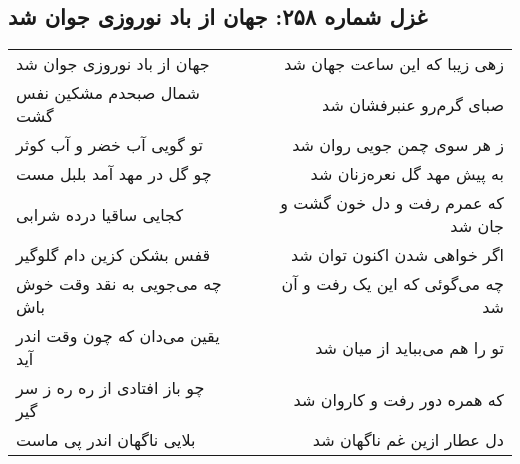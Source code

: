\begin{center}
\section*{غزل شماره ۲۵۸: جهان از باد نوروزی جوان شد}
\label{sec:258}
\begin{longtable}{l p{0.5cm} r}
جهان از باد نوروزی جوان شد
&&
زهی زیبا که این ساعت جهان شد
\\
شمال صبحدم مشکین نفس گشت
&&
صبای گرم‌رو عنبرفشان شد
\\
تو گویی آب خضر و آب کوثر
&&
ز هر سوی چمن جویی روان شد
\\
چو گل در مهد آمد بلبل مست
&&
به پیش مهد گل نعره‌زنان شد
\\
کجایی ساقیا درده شرابی
&&
که عمرم رفت و دل خون گشت و جان شد
\\
قفس بشکن کزین دام گلوگیر
&&
اگر خواهی شدن اکنون توان شد
\\
چه می‌جویی به نقد وقت خوش باش
&&
چه می‌گوئی که این یک رفت و آن شد
\\
یقین می‌دان که چون وقت اندر آید
&&
تو را هم می‌بباید از میان شد
\\
چو باز افتادی از ره ره ز سر گیر
&&
که همره دور رفت و کاروان شد
\\
بلایی ناگهان اندر پی ماست
&&
دل عطار ازین غم ناگهان شد
\\
\end{longtable}
\end{center}
